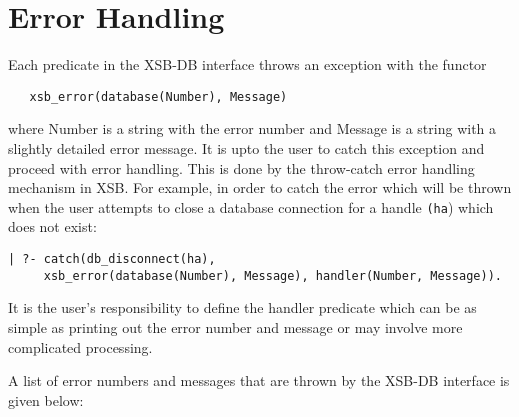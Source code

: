 \section{Error Handling}

Each predicate in the XSB-DB interface throws an exception with the functor 
\begin{verbatim}
   xsb_error(database(Number), Message) 
\end{verbatim}
where Number is a string with the 
error number and Message is a string with a slightly detailed error message.
It is upto the user to catch this exception
and proceed with error handling. This is done by the throw-catch error
handling mechanism in XSB. For example, in order to catch the error which
will be thrown when the user attempts to close a database connection for 
a handle {\tt (ha}) which does not exist:

\begin{verbatim}
| ?- catch(db_disconnect(ha),
     xsb_error(database(Number), Message), handler(Number, Message)).
\end{verbatim}

It is the user's responsibility to define the handler predicate which can be as simple
as printing out the error number and message or may involve more 
complicated  processing.

A list of error numbers and messages that are thrown by the XSB-DB interface
is given below:

